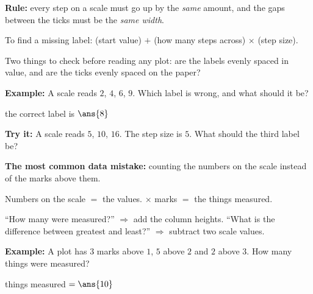 \documentclass[12pt]{article}
\begin{document}


\begin{formulabox}
\textbf{Rule:} every step on a scale must go up by the \emph{same} amount, and the gaps between the
ticks must be the \emph{same width}.\par
To find a missing label: (start value) $+$ (how many steps across) $\times$ (step size).\par
Two things to check before reading any plot: are the labels evenly spaced in value, and are the
ticks evenly spaced on the paper?
\end{formulabox}

\begin{examplebox}
\textbf{Example:} \quad A scale reads $2$, $4$, $6$, $9$. Which label is wrong, and what should it be?

the correct label is $\ans{8}$
\end{examplebox}

\begin{tryitbox}
\textbf{Try it:} \quad A scale reads $5$, $10$, $16$. The step size is $5$. What should the third
label be?\\[2pt]
\end{tryitbox}


\begin{formulabox}
\textbf{The most common data mistake:} counting the numbers on the scale instead of the marks above
them.\par
Numbers on the scale $=$ the values. \quad $\times$ marks $=$ the things measured.\par
``How many were measured?'' $\Rightarrow$ add the column heights. \quad
``What is the difference between greatest and least?'' $\Rightarrow$ subtract two scale values.
\end{formulabox}

\begin{examplebox}
\textbf{Example:} \quad A plot has $3$ marks above $1$, $5$ above $2$ and $2$ above $3$. How many
things were measured?

things measured $= \ans{10}$
\end{examplebox}
\end{document}
